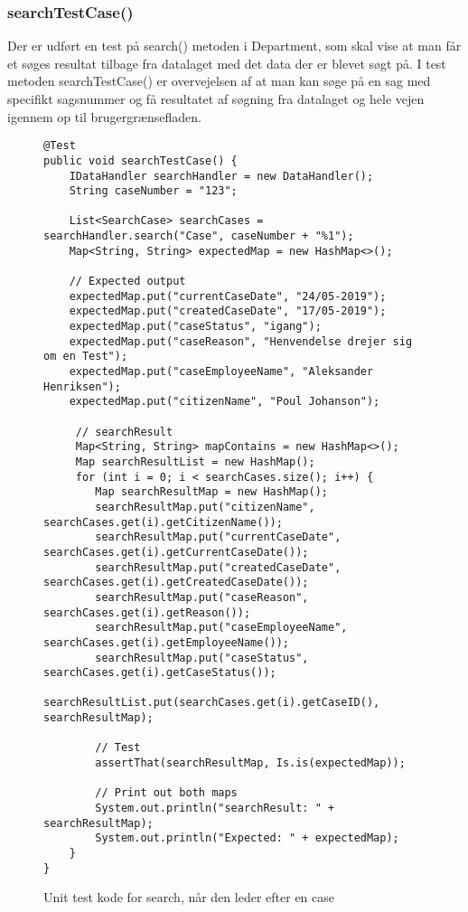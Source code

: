 \subsubsection{searchTestCase()}
Der er udført en test på search() metoden i Department, som skal vise at man får et søges resultat tilbage fra datalaget med det data der er blevet søgt på. I test metoden searchTestCase() er overvejelsen af at man kan søge på en sag med specifikt sagsnummer og få resultatet af søgning fra datalaget og hele vejen igennem op til brugergrænsefladen. \\
\begin{figure}
\begin{lstlisting}
@Test
public void searchTestCase() {
	IDataHandler searchHandler = new DataHandler();
	String caseNumber = "123";
	
	List<SearchCase> searchCases = searchHandler.search("Case", caseNumber + "%1");
	Map<String, String> expectedMap = new HashMap<>();
	
	// Expected output
	expectedMap.put("currentCaseDate", "24/05-2019");
	expectedMap.put("createdCaseDate", "17/05-2019");
	expectedMap.put("caseStatus", "igang");
	expectedMap.put("caseReason", "Henvendelse drejer sig om en Test");
	expectedMap.put("caseEmployeeName", "Aleksander Henriksen");
	expectedMap.put("citizenName", "Poul Johanson");
	
	 // searchResult
	 Map<String, String> mapContains = new HashMap<>();
	 Map searchResultList = new HashMap();
	 for (int i = 0; i < searchCases.size(); i++) {
	 	Map searchResultMap = new HashMap();
	 	searchResultMap.put("citizenName", searchCases.get(i).getCitizenName());
	 	searchResultMap.put("currentCaseDate", searchCases.get(i).getCurrentCaseDate());
	 	searchResultMap.put("createdCaseDate", searchCases.get(i).getCreatedCaseDate());
	 	searchResultMap.put("caseReason", searchCases.get(i).getReason());
	 	searchResultMap.put("caseEmployeeName", searchCases.get(i).getEmployeeName());
	 	searchResultMap.put("caseStatus", searchCases.get(i).getCaseStatus());
	 	searchResultList.put(searchCases.get(i).getCaseID(), searchResultMap);
	 	
	 	// Test
	 	assertThat(searchResultMap, Is.is(expectedMap));
	 	
	 	// Print out both maps
	 	System.out.println("searchResult: " + searchResultMap);
	 	System.out.println("Expected: " + expectedMap);
	}
}
\end{lstlisting}
\caption{Unit test kode for search, når den leder efter en case}
\label{kode:searchcase}
\end{figure}

